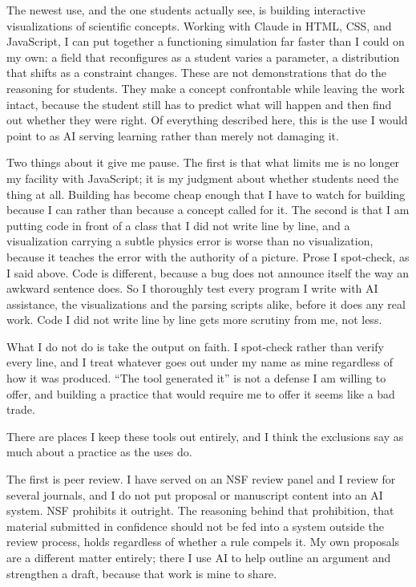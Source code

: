 \documentclass[10pt]{article}
\begin{document}
The newest use, and the one students actually see, is building interactive visualizations of
scientific concepts. Working with Claude in HTML, CSS, and JavaScript, I can put together a
functioning simulation far faster than I could on my own: a field that reconfigures as a student
varies a parameter, a distribution that shifts as a constraint changes. These are not
demonstrations that do the reasoning for students. They make a concept confrontable while
leaving the work intact, because the student still has to predict what will happen and then find
out whether they were right. Of everything described here, this is the use I would point to as
AI serving learning rather than merely not damaging it.

Two things about it give me pause. The first is that what limits me is no longer my facility
with JavaScript; it is my judgment about whether students need the thing at all. Building has
become cheap enough that I have to watch for building because I can rather than because a
concept called for it. The second is that I am putting code in front of a class that I did not
write line by line, and a visualization carrying a subtle physics error is worse than no
visualization, because it teaches the error with the authority of a picture. Prose I spot-check, as I
said above. Code is different, because a bug does not announce itself the way an awkward
sentence does. So I thoroughly test every program I write with AI assistance, the
visualizations and the parsing scripts alike, before it does any real work. Code I did not write
line by line gets more scrutiny from me, not less.

What I do not do is take the output on faith. I spot-check rather than verify every line, and I
treat whatever goes out under my name as mine regardless of how it was produced. ``The tool
generated it'' is not a defense I am willing to offer, and building a practice that would
require me to offer it seems like a bad trade.


There are places I keep these tools out entirely, and I think the exclusions say as much about
a practice as the uses do.

The first is peer review. I have served on an NSF review panel and I review for several
journals, and I do not put proposal or manuscript content into an AI system. NSF prohibits it
outright. The reasoning behind that prohibition, that material submitted in confidence should
not be fed into a system outside the review process, holds regardless of whether a rule compels
it. My own proposals are a different matter entirely; there I use AI to help outline an argument
and strengthen a draft, because that work is mine to share.
\end{document}
